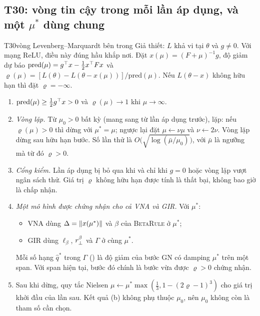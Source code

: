 \subsection{T30: vòng tin cậy trong mỗi lần áp dụng, và một $\mu^*$ dùng chung}

\begin{namedthm}{T30}{vòng Levenberg--Marquardt bên trong}
Giả thiết: $L$ khả vi tại $\theta$ và $g\ne0$. Với mạng ReLU, điều này đúng hầu khắp nơi. Đặt $x(\mu)=(F+\mu)^{-1}g$, độ giảm dự báo $\mathrm{pred}(\mu)=g^{\top} x-\tfrac12x^{\top} Fx$ và $\varrho(\mu)=[L(\theta)-L(\theta-x(\mu))]/\mathrm{pred}(\mu)$. Nếu $L(\theta-x)$ không hữu hạn thì đặt $\varrho=-\infty$.
\begin{enumerate}[label=(\alph*)]
\item $\mathrm{pred}(\mu)\ge\tfrac12g^{\top} x>0$ và $\varrho(\mu)\to1$ khi $\mu\to\infty$.
\item \emph{Vòng lặp.} Từ $\mu_0>0$ bất kỳ (mang sang từ lần áp dụng trước), lặp: nếu $\varrho(\mu)>0$ thì dừng với $\mu^*=\mu$; ngược lại đặt $\mu\leftarrow\nu\mu$ và $\nu\leftarrow2\nu$. Vòng lặp dừng sau hữu hạn bước. Số lần thử là $O\bigl(\sqrt{\log(\bar\mu/\mu_0)}\bigr)$, với $\bar\mu$ là ngưỡng mà từ đó $\varrho>0$.
\item \emph{Cổng kiểm.} Lần áp dụng bị bỏ qua khi và chỉ khi $g=0$ hoặc vòng lặp vượt ngân sách thử. Giá trị $\varrho$ không hữu hạn được tính là thất bại, không bao giờ là chấp nhận.
\item \emph{Một mô hình được chứng nhận cho cả VNA và GIR.} Với $\mu^*$:
\begin{itemize}
\item VNA dùng $\Delta=\lVert x(\mu^*)\rVert$ và $\beta$ của \textsc{BetaRule} ở $\mu^*$;
\item GIR dùng $\ell_\beta$, $r_{\perp}^\beta$ và $\Gamma$ ở cùng $\mu^*$.
\end{itemize}
Mỗi số hạng $\hat q^*$ trong $\Gamma$ () là độ giảm của bước GN có damping $\mu^*$ trên một span. Với span hiện tại, bước đó chính là bước vừa được $\varrho>0$ chứng nhận.
\item Sau khi dừng, quy tắc Nielsen $\mu\leftarrow\mu^*\max(\tfrac13,1-(2\varrho-1)^3)$ cho giá trị khởi đầu của lần sau. Kết quả (b) không phụ thuộc $\mu_0$, nên $\mu_0$ không còn là tham số cần chọn.
\end{enumerate}
\end{namedthm}
